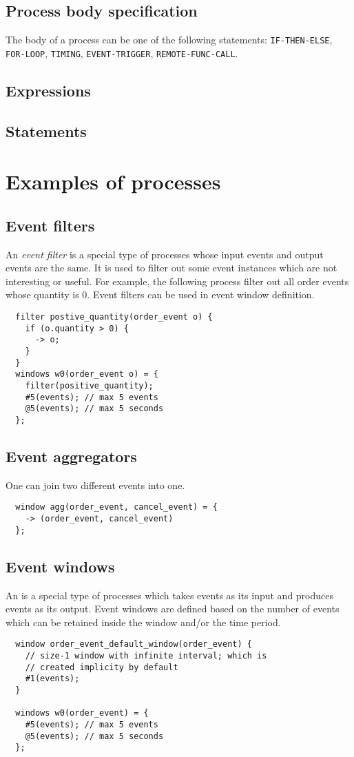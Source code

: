 \documentclass{pamsbook}
\begin{document}
\subsection{Process body specification}
The body of a process can be one of the following statements:
\verb+IF-THEN-ELSE+, \verb+FOR-LOOP+, \verb+TIMING+, 
\verb+EVENT-TRIGGER+, 
\verb+REMOTE-FUNC-CALL+. 

\subsection{Expressions}

\subsection{Statements}

\section{Examples of processes}
\subsection{Event filters}
An {\em event filter\/} is a special type of processes whose input events and output
events are the same. It is used to filter out some event instances which are
not interesting or useful. For example, the following process filter out all order
events whose quantity is 0. Event filters can be used in event window definition.
{\small
\begin{verbatim}
  filter postive_quantity(order_event o) {
    if (o.quantity > 0) {
      -> o;
    }
  }
  windows w0(order_event o) = {
    filter(positive_quantity);
    #5(events); // max 5 events
    @5(events); // max 5 seconds
  };
\end{verbatim}
}

\subsection{Event aggregators}
One can join two different events into one.
{\small
\begin{verbatim}
  window agg(order_event, cancel_event) = {
    -> (order_event, cancel_event)
  };
\end{verbatim}
}

\subsection{Event windows}
An  is a special type of processes which takes events as its
input and produces events as its output. Event windows are defined based on
the number of events which can be retained inside the window and/or the time
period. 
{\small
\begin{verbatim}
  window order_event_default_window(order_event) {
    // size-1 window with infinite interval; which is 
    // created implicity by default
    #1(events);
  }

  windows w0(order_event) = {
    #5(events); // max 5 events
    @5(events); // max 5 seconds
  };
\end{verbatim}
}
\end{document}
